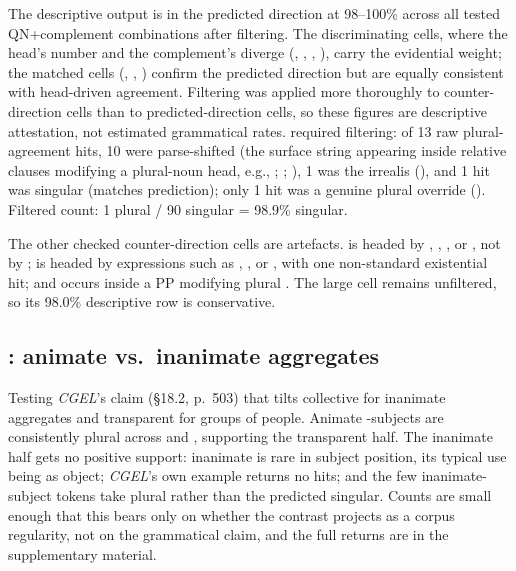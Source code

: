 The descriptive output is in the predicted direction at 98--100\% across all tested QN+complement combinations after filtering. The discriminating cells, where the head's number and the complement's diverge (, , , ), carry the evidential weight; the matched cells (, , ) confirm the predicted direction but are equally consistent with head-driven agreement. Filtering was applied more thoroughly to counter-direction cells than to predicted-direction cells, so these figures are descriptive attestation, not estimated grammatical rates.  required filtering: of 13 raw plural-agreement hits, 10 were parse-shifted (the surface string  appearing inside relative clauses modifying a plural-noun head, e.g., ; ; ), 1 was the irrealis  (), and 1  hit was singular  (matches prediction); only 1 hit was a genuine plural override (). Filtered count: 1 plural / 90 singular = 98.9\% singular.

The other checked counter-direction cells are artefacts.  is headed by , , , or , not by ;  is headed by expressions such as , , or , with one non-standard existential hit; and  occurs inside a PP modifying plural . The large  cell remains unfiltered, so its 98.0\% descriptive row is conservative.

\subsection{\texorpdfstring{: animate vs.~inanimate aggregates}{Bunch: animate vs. inanimate aggregates}}\label{a.4-bunch-animate-vs.-inanimate-aggregates}

Testing \textit{CGEL}'s claim (§18.2, p.~503) that  tilts collective for inanimate aggregates and transparent for groups of people. Animate -subjects are consistently plural across  and , supporting the transparent half. The inanimate half gets no positive support: inanimate  is rare in subject position, its typical use being as object; \textit{CGEL}'s own example  returns no hits; and the few inanimate-subject tokens take plural rather than the predicted singular. Counts are small enough that this bears only on whether the contrast projects as a corpus regularity, not on the grammatical claim, and the full returns are in the supplementary material.

